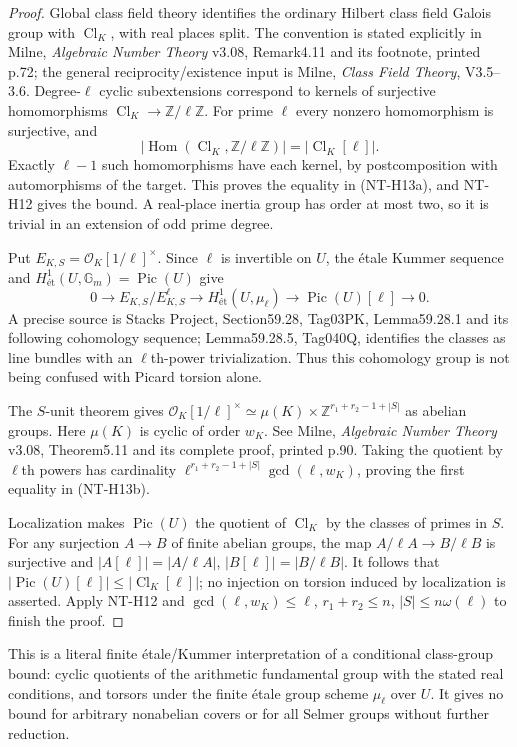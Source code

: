 \documentclass[11pt,a4paper]{article}
\begin{document}
\begin{proof}
Global class field theory identifies the ordinary Hilbert class field
Galois group with $\operatorname{Cl}_K$, with real places split.
The convention is stated explicitly in Milne, \emph{Algebraic Number
Theory} v3.08, Remark4.11 and its footnote, printed p.72; the general
reciprocity/existence input is Milne, \emph{Class Field Theory}, V3.5--3.6.
Degree-$\ell$ cyclic subextensions correspond to kernels of surjective
homomorphisms $\operatorname{Cl}_K\to\mathbb Z/\ell\mathbb Z$.
For prime $\ell$ every nonzero homomorphism is surjective, and
\[
 |\operatorname{Hom}(\operatorname{Cl}_K,\mathbb Z/\ell\mathbb Z)|
      =|\operatorname{Cl}_K[\ell]|.
\]
Exactly $\ell-1$ such homomorphisms have each kernel, by postcomposition
with automorphisms of the target. This proves the equality in
(NT-H13a), and NT-H12 gives the bound. A real-place inertia group has
order at most two, so it is trivial in an extension of odd prime degree.

Put $E_{K,S}=\mathcal O_K[1/\ell]^\times$. Since $\ell$ is invertible
on $U$, the étale Kummer sequence and
$H^1_{\text{ét}}(U,\mathbb G_m)=\operatorname{Pic}(U)$ give
\[
 0\longrightarrow
 E_{K,S}/E_{K,S}^{\ell}
 \longrightarrow H^1_{\text{ét}}(U,\mu_\ell)
 \longrightarrow\operatorname{Pic}(U)[\ell]
 \longrightarrow0.                                    \tag{NT-H13c}
\]
A precise source is Stacks Project, Section59.28, Tag03PK,
Lemma59.28.1 and its following cohomology sequence; Lemma59.28.5,
Tag040Q, identifies the classes as line bundles with an $\ell$th-power
trivialization. Thus this cohomology group is not being confused with
Picard torsion alone.

The $S$-unit theorem gives
$\mathcal O_K[1/\ell]^\times\simeq\mu(K)\times
\mathbb Z^{r_1+r_2-1+|S|}$ as abelian groups. Here $\mu(K)$ is cyclic
of order $w_K$. See Milne, \emph{Algebraic Number Theory} v3.08,
Theorem5.11 and its complete proof, printed p.90. Taking the quotient
by $\ell$th powers has cardinality
$\ell^{r_1+r_2-1+|S|}\gcd(\ell,w_K)$, proving the first equality in
(NT-H13b).

Localization makes $\operatorname{Pic}(U)$ the quotient of
$\operatorname{Cl}_K$ by the classes of primes in $S$. For any
surjection $A\to B$ of finite abelian groups, the map
$A/\ell A\to B/\ell B$ is surjective and
$|A[\ell]|=|A/\ell A|$, $|B[\ell]|=|B/\ell B|$.
It follows that $|\operatorname{Pic}(U)[\ell]|
\le|\operatorname{Cl}_K[\ell]|$; no injection on torsion induced by
localization is asserted. Apply NT-H12 and
$\gcd(\ell,w_K)\le\ell$, $r_1+r_2\le n$,
$|S|\le n\omega(\ell)$ to finish the proof.
\end{proof}
This is a literal finite étale/Kummer interpretation of a conditional
class-group bound: cyclic quotients of the arithmetic fundamental
group with the stated real conditions, and torsors under the finite
étale group scheme $\mu_\ell$ over $U$. It gives no bound for arbitrary
nonabelian covers or for all Selmer groups without further reduction.
\end{document}
